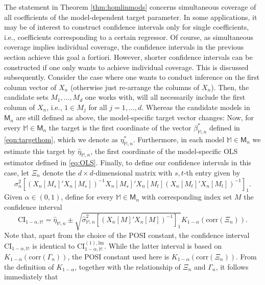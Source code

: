 \documentclass[preprint]{imsart}
\numberwithin{equation}{section}
\begin{document}
The statement in Theorem \ref{thm:homlinmods} concerns simultaneous coverage of all coefficients of the model-dependent target parameter. In some applications, it may be of interest to construct confidence intervals only for single coefficients, i.e., coefficients corresponding to a certain regressor. Of course, as simultaneous coverage implies individual coverage, the confidence intervals in the previous section achieve this goal a fortiori. However, shorter confidence intervals can be constructed if one only wants to achieve individual coverage. This is discussed subsequently. Consider the case where one wants to conduct inference on the first column vector of $X_n$ (otherwise just re-arrange the columns of $X_n$). Then, the candidate sets $M_1, \hdots, M_d$ one works with, will all necessarily include the first column of $X_n$, i.e., $1\in M_j$ for all $j=1,\dots, d$. Whereas the candidate models in $\mathsf{M}_n$ are still defined as above, the model-specific target vector changes: Now, for every $\mathbb{M} \in \mathsf{M}_n$ the target is the first coordinate of the vector $\beta^*_{\mathbb{M}, n}$ defined in \eqref{eqn:targethom}, which we denote as $\eta^*_{\mathbb{M}, n}$. Furthermore, in each model $\mathbb{M} \in \mathsf{M}_n$ we estimate this target by $\hat{\eta}_{\mathbb{M}, n}$, the first coordinate of the model-specific OLS estimator defined in \eqref{eq:OLS}. Finally, to define our confidence intervals in this case, let $\Xi_n$ denote the $d \times d$-dimensional matrix with $s,t$-th entry given by
%
\begin{equation*}
\sigma_n^2\left[ \left( X_n[M_s]' X_n[M_s] \right)^{-1} X_n[M_s]' X_n[M_t] \left( X_n[M_t]' X_n[M_t] \right)^{-1} \right]_{1}.
\end{equation*}
%
Given $\alpha \in (0, 1)$, define for every $\mathbb{M} \in \mathsf{M}_n$ with corresponding index set $M$ the confidence interval
%
\begin{equation*}
\mathrm{CI}_{1-\alpha, \mathbb{M}} = \hat{\eta}_{\mathbb{M}, n} \pm \sqrt{\hat{\sigma}^2_{\mathbb{M}, n} \left[ (X_n[M]'X_n[M])^{-1} \right]_1} K_{1-\alpha}(\mathrm{corr}(\Xi_n)).
\end{equation*}
%
Note that, apart from the choice of the POSI constant, the confidence interval $\mathrm{CI}_{1-\alpha, \mathbb{M}}$ is identical to $\mathrm{CI}^{(1), \mathrm{lm}}_{1-\alpha, \mathbb{M}}$. While the latter interval is based on $K_{1-\alpha}(\mathrm{corr}(\Gamma_n))$, the POSI constant used here is $K_{1-\alpha}(\mathrm{corr}(\Xi_n))$. From the definition of $K_{1-\alpha}$, together with the relationship of $\Xi_n$ and $\Gamma_n$, it follows immediately that 
\end{document}
